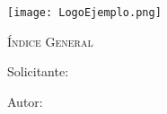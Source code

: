 \documentclass[main]{subfiles}
\begin{document}
\newpage
\thispagestyle{empty}
\begin{center}
    \centering
    \texttt{[image: LogoEjemplo.png]} \par
    \vspace{3 cm}
    {\scshape\Huge Índice General \par}
    \vspace{1.5cm}
    {\itshape\Huge \TituloProyecto \par}
    \vfill
    {\Large Solicitante:  \Solicitante \par}
    \vspace{0.5cm}
    {\Large Autor:  \Autor \par}
    \vspace{1.5cm}
    {\Large \Fecha \par}
\end{center}

\newpage
\tableofcontents
\end{document}

